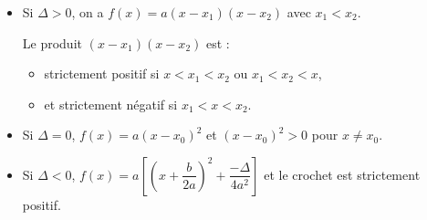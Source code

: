 \begin{demo}
	\nline
	\begin{itemize}
		\item Si $\Delta > 0$, on a $f(x) = a(x - x_1)(x - x_2)$ avec $x_1 < x_2$.

		      Le produit $(x - x_1)(x - x_2)$ est :
		      \begin{itemize}
			      \item strictement positif si $x < x_1 < x_2$ ou $x_1 < x_2 < x$,
			      \item et strictement négatif si $x_1 < x < x_2$.
		      \end{itemize}
		\item Si $\Delta = 0$, $f(x) = a(x - x_0)^2$ et $(x - x_0)^2 > 0$ pour $x \neq x_0$.
		\item Si $\Delta < 0$, $f(x) = a\left[\left(x + \dfrac{b}{2a}\right)^2 + \dfrac{-\Delta}{4a^2}\right]$ et le crochet est strictement positif.
	\end{itemize}
\end{demo}

\newpage

